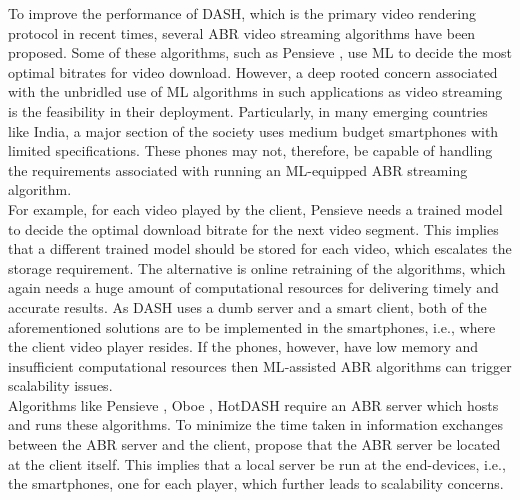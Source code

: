 

\vspace{1cm}


To improve the performance of \ac{DASH}, which is the primary video rendering protocol in recent times,  several \ac{ABR} video streaming algorithms have been proposed. Some of these algorithms, such as Pensieve \cite{mao2017neural}, use \ac{ML} to decide the most optimal bitrates for video download. However, a deep rooted concern associated with the unbridled use of \ac{ML} algorithms in such applications as video streaming is the feasibility in their deployment. Particularly, in many emerging countries like India, a major section of the society uses medium budget smartphones with limited specifications. These phones may not, therefore, be capable of handling the requirements associated with running an \ac{ML}-equipped \ac{ABR} streaming algorithm.\\
\indent For example, for each video played by the client, Pensieve \cite{mao2017neural} needs a trained model to decide the optimal download bitrate for the next video segment. This implies that  a different trained model should be stored for each video, which escalates the storage requirement. The alternative is online retraining of the algorithms, which again needs a huge amount of computational resources for delivering timely and accurate results. As DASH uses a dumb server and a smart client, both of the aforementioned solutions are to be implemented in the smartphones, i.e., where the client video player resides.  If the phones, however, have low memory and insufficient computational resources then \ac{ML}-assisted \ac{ABR} algorithms can trigger scalability issues.\\
\indent Algorithms like Pensieve \cite{mao2017neural}, Oboe \cite{Akhtar2018}, HotDASH \cite{Sengupta2018} require an  ABR server which hosts and runs these algorithms. To minimize the time taken in information exchanges between the \ac{ABR} server and the client, \cite{mao2017neural,Akhtar2018,Sengupta2018} propose that the \ac{ABR} server be located at the client itself. This implies that a local server be run at the end-devices, i.e., the smartphones, one for each player, which further leads to scalability concerns.\\

